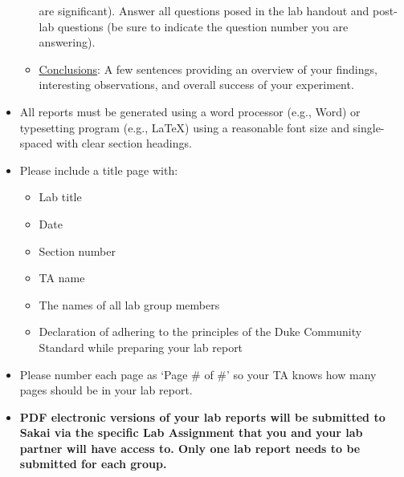 \begin{itemize}
\begin{itemize}
            are significant).  Answer all questions posed in the lab handout
            and post-lab questions (be sure to indicate the question number you
            are answering).  
        \item \underline{Conclusions}: A few sentences providing an overview of
            your findings, interesting observations, and overall success of
            your experiment.
    \end{itemize}
    \item All reports must be generated using a word processor (e.g., Word) or
        typesetting program (e.g., \LaTeX) using a reasonable font size and
        single-spaced with clear section headings.
    \item Please include a title page with:
        \begin{itemize}
            \item Lab title
            \item Date
            \item Section number
            \item TA name
            \item The names of all lab group members
            \item Declaration of adhering to the principles of the Duke Community Standard while preparing your lab report
        \end{itemize}
    \item Please number each page as `Page \# of \#' so your TA knows how many
        pages should be in your lab report.
    \item {\bf PDF electronic versions of your lab reports will be submitted to
            Sakai via the specific Lab Assignment that you and your lab partner
            will have access to.  Only one lab report needs to be submitted for
            each group.}
\end{itemize}
